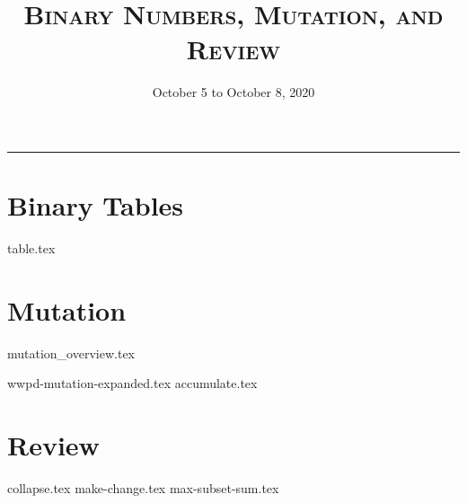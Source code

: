 \documentclass{exam}
\title{\textsc{Binary Numbers, Mutation, and Review}}
\date{October 5 to October 8, 2020}
\begin{document}
\maketitle
\rule{\textwidth}{0.15em}
\fontsize{12}{15}\selectfont

\section{Binary Tables}
\begin{questions}
{table.tex}
\end{questions}

\section{Mutation}
{mutation_overview.tex}
\begin{questions}
{wwpd-mutation-expanded.tex}
\newpage
\newpage
{accumulate.tex}
\end{questions}

\newpage
\section{Review}
\begin{questions}
{collapse.tex}
\newpage
{make-change.tex}
\newpage
{max-subset-sum.tex}
\end{questions}
\end{document}
